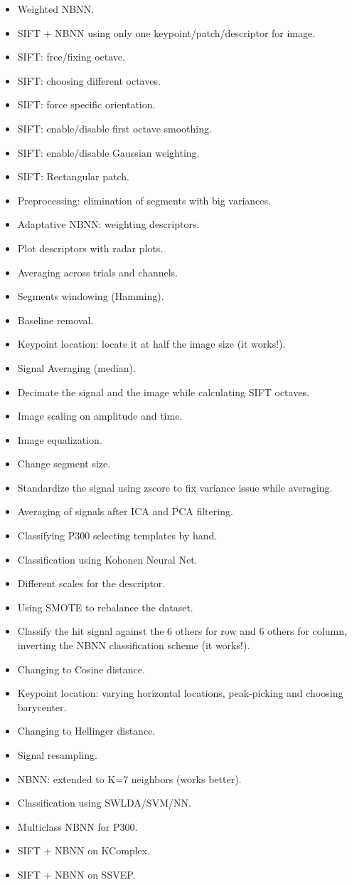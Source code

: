 \begin{itemize}
\item Weighted NBNN.
\item SIFT + NBNN using only one keypoint/patch/descriptor for image.
\item SIFT: free/fixing octave.
\item SIFT: choosing different octaves.
\item SIFT: force specific orientation.
\item SIFT: enable/disable first octave smoothing.
\item SIFT: enable/disable Gaussian weighting.
\item SIFT: Rectangular patch.
\item Preprocessing: elimination of segments with big variances.
\item Adaptative NBNN: weighting descriptors.
\item Plot descriptors with radar plots.
\item Averaging across trials and channels.
\item Segments windowing (Hamming).
\item Baseline removal.
\item Keypoint location: locate it at half the image size (it works!).
\item Signal Averaging (median).
\item Decimate the signal and the image while calculating SIFT octaves.
\item Image scaling on amplitude and time.
\item Image equalization.
\item Change segment size.
\item Standardize the signal using zscore to fix variance issue while averaging.
\item Averaging of signals after ICA and PCA filtering.
\item Classifying P300 selecting templates by hand.
\item Classification using Kohonen Neural Net.
\item Different scales for the descriptor.
\item Using SMOTE to rebalance the dataset.
\item Classify the hit signal against the 6 others for row and 6 others for column, inverting the NBNN classification scheme (it works!).
\item Changing to Cosine distance.
\item Keypoint location: varying horizontal locations, peak-picking and choosing barycenter.
\item Changing to Hellinger distance.
\item Signal resampling.
\item NBNN: extended to K=7 neighbors (works better).
\item Classification using SWLDA/SVM/NN.
\item Multiclass NBNN for P300.
\item SIFT + NBNN on KComplex.
\item SIFT + NBNN on SSVEP.
\end{itemize}


